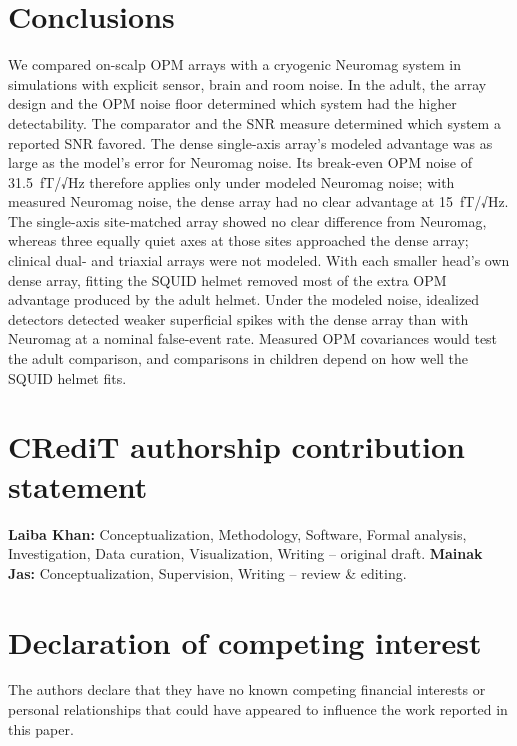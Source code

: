 \documentclass[preprint,12pt,authoryear,a4paper]{elsarticle}
\begin{document}

\section{Conclusions}\label{sec:conclusions}

We compared on-scalp OPM arrays with a cryogenic Neuromag system in simulations with explicit sensor, brain and room noise. In the adult, the array design and the OPM noise floor determined which system had the higher detectability. The comparator and the SNR measure determined which system a reported SNR favored. The dense single-axis array's modeled advantage was as large as the model's error for Neuromag noise. Its break-even OPM noise of 31.5~fT/√Hz therefore applies only under modeled Neuromag noise; with measured Neuromag noise, the dense array had no clear advantage at 15~fT/√Hz. The single-axis site-matched array showed no clear difference from Neuromag, whereas three equally quiet axes at those sites approached the dense array; clinical dual- and triaxial arrays were not modeled. With each smaller head's own dense array, fitting the SQUID helmet removed most of the extra OPM advantage produced by the adult helmet. Under the modeled noise, idealized detectors detected weaker superficial spikes with the dense array than with Neuromag at a nominal false-event rate. Measured OPM covariances would test the adult comparison, and comparisons in children depend on how well the SQUID helmet fits.

\section*{CRediT authorship contribution statement}

\textbf{Laiba Khan:} Conceptualization, Methodology, Software, Formal analysis, Investigation, Data curation, Visualization, Writing -- original draft. \textbf{Mainak Jas:} Conceptualization, Supervision, Writing -- review \& editing.

\section*{Declaration of competing interest}

The authors declare that they have no known competing financial interests or personal relationships that could have appeared to influence the work reported in this paper.
\end{document}
